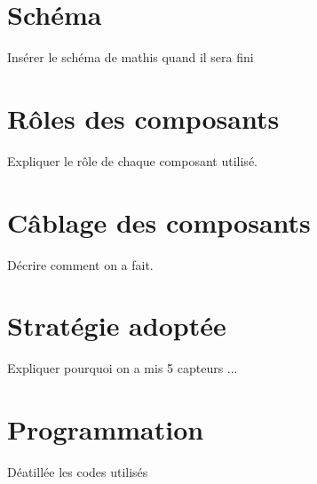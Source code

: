 \section{Schéma}
Insérer le schéma de mathis quand il sera fini

\section{Rôles des composants}
Expliquer le rôle de chaque composant utilisé.

\section{Câblage des composants}
Décrire comment on a fait.

\section{Stratégie adoptée}
Expliquer pourquoi on a mis 5 capteurs ...

\section{Programmation}
Déatillée les codes utilisés